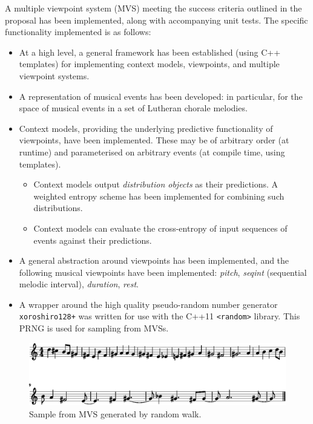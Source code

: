 \documentclass[12pt,a4paper,twoside]{article}
\begin{document}
A multiple viewpoint system (MVS) meeting the success criteria outlined in the
proposal has been implemented, along with accompanying unit tests. The specific
functionality implemented is as follows:
\begin{itemize}
  \item At a high level, a general framework has been established (using C++
    templates) for implementing context models, viewpoints, and multiple
    viewpoint systems.
  \item A representation of musical events has been developed: in particular,
    for the space of musical events in a set of Lutheran chorale melodies.
  \item Context models, providing the underlying predictive functionality of
    viewpoints, have been implemented. These may be of arbitrary order (at
    runtime) and parameterised on arbitrary events (at compile time, using
    templates). 
    \begin{itemize}
      \item Context models output \emph{distribution objects} as their
        predictions. A weighted entropy scheme has been implemented for
        combining such distributions. 
      \item Context models can evaluate the cross-entropy of input sequences of
        events against their predictions.
    \end{itemize}
  \item A general abstraction around viewpoints has been implemented, and the
    following musical viewpoints have been implemented: \emph{pitch},
    \emph{seqint} (sequential melodic interval), \emph{duration}, \emph{rest}.

  \item A wrapper around the high quality pseudo-random number generator
    \texttt{xoroshiro128+} was written for use with the C++11 \texttt{<random>}
    library. This PRNG is used for sampling from MVSs.

\end{itemize}

\begin{figure}[H]
\centering
\includegraphics[width=400pt]{figs/mvs_trimmed.eps}
\caption{Sample from MVS generated by random walk.}
\label{fig:mvs-out}
\end{figure}
\end{document}
